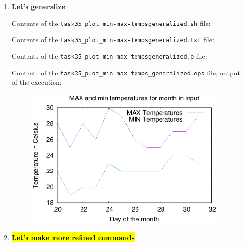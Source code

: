 \documentclass[9pt]{article}
\begin{document}
\begin{enumerate}
	\item \textbf{Let's generalize}
	
		Contents of the \texttt{task35\_plot\_min-max-tempsgeneralized.sh} file:
		
		Contents of the \texttt{task35\_plot\_min-max-tempsgeneralized.txt} file:
		
		Contents of the \texttt{task35\_plot\_min-max-tempsgeneralized.p} file:
	
		Contents of the \texttt{task35\_plot\_min-max-temps\_generalized.eps} file, output of the execution:
		\begin{figure}[h!]
			\centering
			\includegraphics[width=10cm]{../task34_plot_min-max-temps_generalized.eps}
		\end{figure}		
	
	\item \hl{\textbf{Let's make more refined commands}}
	
\end{enumerate}
\end{document}
